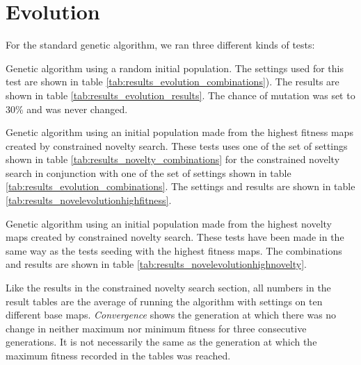 \section{Evolution}
\label{results_evolution}



For the standard genetic algorithm, we ran three different kinds of tests:

\begin{my_itemize}

	\item Genetic algorithm using a random initial population. The settings used for this test are shown in table \ref{tab:results_evolution_combinations}). The results are shown in table \ref{tab:results_evolution_results}. The chance of mutation was set to 30\% and was never changed.

	\item Genetic algorithm using an initial population made from the highest fitness maps created by constrained novelty search. These tests uses one of the set of settings shown in table \ref{tab:results_novelty_combinations} for the constrained novelty search in conjunction with one of the set of settings shown in table \ref{tab:results_evolution_combinations}. The settings and results are shown in table \ref{tab:results_novelevolutionhighfitness}.

	\item Genetic algorithm using an initial population made from the highest novelty maps created by constrained novelty search. These tests have been made in the same way as the tests seeding with the highest fitness maps. The combinations and results are shown in table \ref{tab:results_novelevolutionhighnovelty}.

\end{my_itemize}

Like the results in the constrained novelty search section, all numbers in the result tables are the average of running the algorithm with settings on ten different base maps. \textit{Convergence} shows the generation at which there was no change in neither maximum nor minimum fitness for three consecutive generations. It is not necessarily the same as the generation at which the maximum fitness recorded in the tables was reached.

